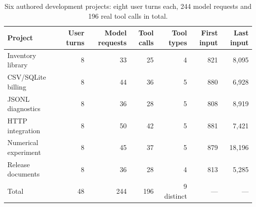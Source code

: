 \begin{table}[t]
\centering\small
\caption{Six authored development projects: eight user turns each, 244 model requests and 196 real tool calls in total.}
\label{tab:workload-projects}
\begin{tabular}{@{}lrrrrrr@{}}
\toprule
Project & User turns & Model requests & Tool calls & Tool types & First input & Last input \\
\midrule
Inventory library & 8 & 33 & 25 & 4 & 821 & 8,095 \\
CSV/SQLite billing & 8 & 44 & 36 & 5 & 880 & 6,928 \\
JSONL diagnostics & 8 & 36 & 28 & 5 & 808 & 8,919 \\
HTTP integration & 8 & 50 & 42 & 5 & 881 & 7,421 \\
Numerical experiment & 8 & 45 & 37 & 5 & 879 & 18,196 \\
Release documents & 8 & 36 & 28 & 4 & 813 & 5,285 \\
\midrule
Total & 48 & 244 & 196 & 9 distinct & --- & --- \\
\bottomrule
\end{tabular}
\end{table}
